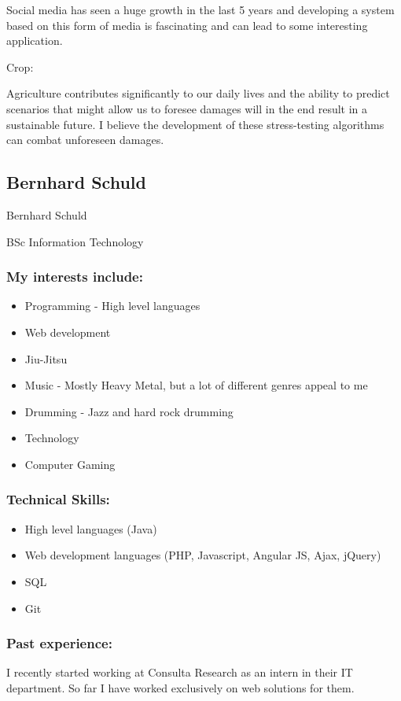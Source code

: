 \documentclass{article}
\begin{document}
	Social media has seen a huge growth in the last 5 years and developing a system based on this form of media is fascinating and can lead to some interesting application.
	
	Crop:
	
	Agriculture contributes significantly to our daily lives and the ability to predict scenarios that might allow us to foresee damages will in the end result in a sustainable future. I believe the development of these stress-testing algorithms can combat unforeseen damages.
	
	
	
	\subsection{Bernhard Schuld}
	Bernhard Schuld 
	
	BSc Information Technology
	\subsubsection{My interests include:}
	\begin{itemize}
		\item Programming - High level languages
		\item Web development
		\item Jiu-Jitsu
		\item Music - Mostly Heavy Metal, but a lot of different genres appeal to me
		\item Drumming - Jazz and hard rock drumming
		\item Technology
		\item Computer Gaming		
	\end{itemize}
	\subsubsection{Technical Skills:}
	\begin{itemize}
		\item High level languages (Java)
		\item Web development languages (PHP, Javascript, Angular JS, Ajax, jQuery)
		\item SQL
		\item Git
	\end{itemize}
	\subsubsection{Past experience:}
		I recently started working at Consulta Research as an intern in their IT department. So far I have worked exclusively on web solutions for them.
\end{document}
